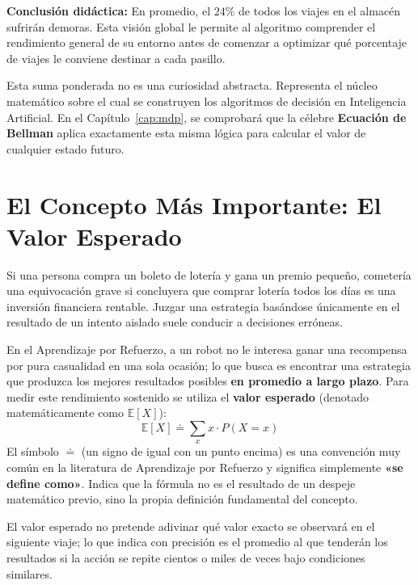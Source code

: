 \textbf{Conclusión didáctica:} En promedio, el $24\%$ de todos los viajes en el almacén sufrirán demoras. Esta visión global le permite al algoritmo comprender el rendimiento general de su entorno antes de comenzar a optimizar qué porcentaje de viajes le conviene destinar a cada pasillo.

\begin{ideaclave}
Esta suma ponderada no es una curiosidad abstracta. Representa el núcleo matemático sobre el cual se construyen los algoritmos de decisión en Inteligencia Artificial. En el Capítulo~\ref{cap:mdp}, se comprobará que la célebre \textbf{Ecuación de Bellman} aplica exactamente esta misma lógica para calcular el valor de cualquier estado futuro.
\end{ideaclave}

\section{El Concepto Más Importante: El Valor Esperado}
Si una persona compra un boleto de lotería y gana un premio pequeño, cometería una equivocación grave si concluyera que comprar lotería todos los días es una inversión financiera rentable. Juzgar una estrategia basándose únicamente en el resultado de un intento aislado suele conducir a decisiones erróneas.

En el Aprendizaje por Refuerzo, a un robot no le interesa ganar una recompensa por pura casualidad en una sola ocasión; lo que busca es encontrar una estrategia que produzca los mejores resultados posibles \textbf{en promedio a largo plazo}. Para medir este rendimiento sostenido se utiliza el \textbf{valor esperado} (denotado matemáticamente como $\mathbb{E}[X]$):
\begin{equation}
  \mathbb{E}[X] \doteq \sum_{x} x \cdot P(X = x)
\end{equation}
El símbolo $\doteq$ (un signo de igual con un punto encima) es una convención muy común en la literatura de Aprendizaje por Refuerzo y significa simplemente \textbf{«se define como»}. Indica que la fórmula no es el resultado de un despeje matemático previo, sino la propia definición fundamental del concepto.

El valor esperado no pretende adivinar qué valor exacto se observará en el siguiente viaje; lo que indica con precisión es el promedio al que tenderán los resultados si la acción se repite cientos o miles de veces bajo condiciones similares.


